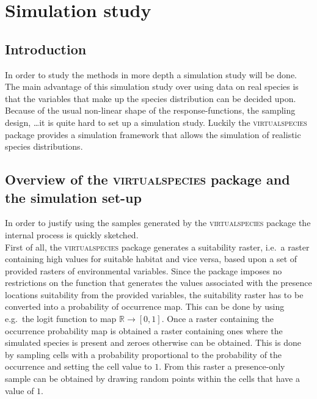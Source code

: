 \chapter{Simulation study}
\label{chap:SimulationStudy}

\section{Introduction}
In order to study the methods in more depth a simulation study will be done. The main advantage of this simulation study over using data on real species is that the variables that make up the species distribution can be decided upon. Because of the usual non-linear shape of the response-functions, the sampling design, \dots it is quite hard to set up a simulation study. Luckily the
\textsc{virtualspecies} package \parencite{virtualspecies, leroy2015virtualspecies} provides a simulation framework that allows the simulation of realistic species distributions. \\

\section{Overview of the \textsc{virtualspecies} package and the simulation set-up}
In order to justify using the samples generated by the \textsc{virtualspecies} package the internal process is quickly sketched. \\

First of all, the \textsc{virtualspecies} package generates a suitability raster, i.e.\ a raster containing high values for suitable habitat and vice versa, based upon a set of provided rasters of environmental variables. Since the package imposes no restrictions on the function that generates the values associated with the presence locations suitability from the provided variables, the suitability raster has to be converted into a probability of occurrence map. This can be done by using e.g.\ the logit function to map $\mathbb{R} \to [0,1]$. Once a raster containing the occurrence probability map is obtained a raster containing ones where the simulated species is present and zeroes otherwise can be obtained. This is done by sampling cells with a probability proportional to the probability of the occurrence and setting the cell value to $1$. From this raster a presence-only sample can be obtained by drawing random points within the cells that have a value of $1$.\\

